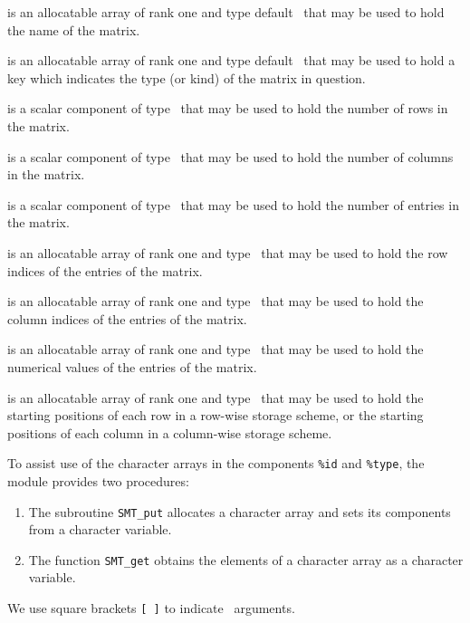 \documentclass{galahad}
\newcommand{\packagename}{SMT}
\begin{document}
\begin{description}
 is an allocatable array of rank one and type default \character\, 
that may be used to hold the name of the matrix. 
 
 is an allocatable array of rank one and type default \character\, 
that may be used to hold a key which indicates the type (or kind) of the 
matrix in question.  
 
 is a scalar component of type \integer\, 
that may be used to hold the number of rows in the matrix. 
 
 is a scalar component of type \integer\, 
that may be used to hold the number of columns in the matrix. 
 
 is a scalar component of type \integer\, 
that may be used to hold the number of entries in the matrix. 
 
 is an allocatable array of rank one and  
type \integer\, that may be used to hold 
the row indices of the entries of the matrix. 
 
 is an allocatable array of rank one and  
type \integer\, that may be used to hold 
the column indices of the entries of the matrix. 
 
 is an allocatable array of rank one and  
type \realdp\, that may be used to hold 
the numerical values of the entries of the matrix. 
 
 is an allocatable array of rank one and  
type \integer\, that may be used to hold 
the starting positions of each row in a row-wise storage scheme, 
or the starting positions of each column in a column-wise storage  
scheme. 
\end{description}


\galarguments

To assist use of the character arrays in the components {\tt \%id} and
{\tt \%type}, the module provides two procedures:

\begin{enumerate}
\item The subroutine {\tt \packagename\_put}
allocates a character array and sets
its components from a character variable.

\item The function {\tt \packagename\_get} 
obtains the elements of a character array as a character variable.
\end{enumerate}
We use square brackets {\tt [ ]} to indicate \optional\ arguments.
\end{document}
